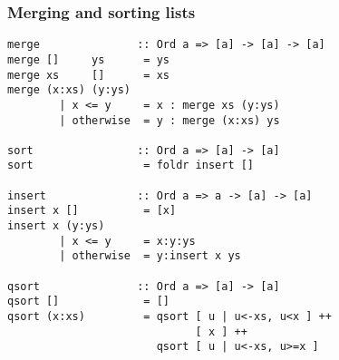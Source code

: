 \subsubsection*{Merging and sorting lists}
\begin{verbatim}
merge               :: Ord a => [a] -> [a] -> [a] 
merge []     ys      = ys
merge xs     []      = xs
merge (x:xs) (y:ys)
        | x <= y     = x : merge xs (y:ys)
        | otherwise  = y : merge (x:xs) ys

sort                :: Ord a => [a] -> [a]
sort                 = foldr insert []

insert              :: Ord a => a -> [a] -> [a]
insert x []          = [x]
insert x (y:ys)
        | x <= y     = x:y:ys
        | otherwise  = y:insert x ys

qsort               :: Ord a => [a] -> [a]
qsort []             = []
qsort (x:xs)         = qsort [ u | u<-xs, u<x ] ++
                             [ x ] ++
                       qsort [ u | u<-xs, u>=x ]
\end{verbatim}
